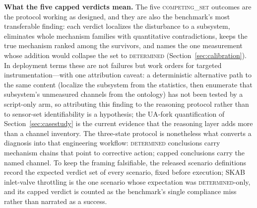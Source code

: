 \documentclass[preprint,12pt]{elsarticle}
\begin{document}
\textbf{What the five capped verdicts mean.} The five \mbox{\textsc{competing\_set}} outcomes are the protocol working as designed, and they are also the benchmark's most transferable finding: each verdict localizes the disturbance to a subsystem, eliminates whole mechanism families with quantitative contradictions, keeps the true mechanism ranked among the survivors, and names the one measurement whose addition would collapse the set to \mbox{\textsc{determined}} (Section~\ref{sec:calibration}). In deployment terms these are not failures but work orders for targeted instrumentation---with one attribution caveat: a deterministic alternative path to the same content (localize the subsystem from the statistics, then enumerate that subsystem's unmeasured channels from the ontology) has not been tested by a script-only arm, so attributing this finding to the reasoning protocol rather than to sensor-set identifiability is a hypothesis; the UA-fork quantification of Section~\ref{sec:casestudy} is the current evidence that the reasoning layer adds more than a channel inventory. The three-state protocol is nonetheless what converts a diagnosis into that engineering workflow: \mbox{\textsc{determined}} conclusions carry mechanism chains that point to corrective action; capped conclusions carry the named channel. To keep the framing falsifiable, the released scenario definitions record the expected verdict set of every scenario, fixed before execution; SKAB inlet-valve throttling is the one scenario whose expectation was \mbox{\textsc{determined}}-only, and its capped verdict is counted as the benchmark's single compliance miss rather than narrated as a success.
\end{document}
